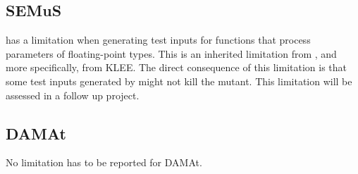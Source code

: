 \subsection{SEMuS}

\SEMUS has a limitation when generating test inputs for functions that process parameters of floating-point types. This is an inherited limitation from \SEMU, and more specifically, from KLEE. The direct consequence of this limitation is that some test inputs generated by \SEMUS might not kill the mutant. This limitation will be assessed in a follow up project.

\subsection{DAMAt}

No limitation has to be reported for DAMAt.